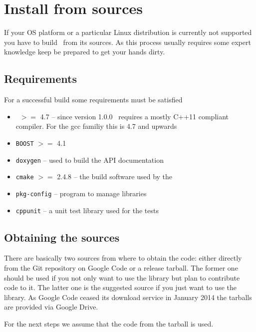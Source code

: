 \section{Install from sources}

If your OS platform or a particular Linux distribution is currently not
supported you have to build \libpnicore\ from its sources. As this process
usually requires some expert knowledge keep be prepared to get your hands dirty.

\subsection{Requirements}

For a successful build some requirements must be satisfied
\begin{itemize}
\item \gcc\ $>=$ 4.7 -- since version 1.0.0 \libpnicore\ requires a mostly C++11
compliant compiler. For the gcc familiy this is 4.7 and upwards
\item \texttt{BOOST} \cite{web:boostsite} $>=$ 4.1
\item \texttt{doxygen} \cite{web:doxygen} -- used to build the API documentation
\item \texttt{cmake} \cite{web:cmake} $>=$ 2.4.8 -- the build software used by the \libpnicore
\item \texttt{pkg-config} \cite{web:pkgconfig} -- program to manage libraries
\item \texttt{cppunit} \cite{web:cppunit} -- a unit test library used for the tests
\end{itemize}

\subsection{Obtaining the sources}

There are basically two sources from where to obtain the code: either directly
from the Git repository on Google Code or a release tarball. The former one
should be used if you not only want to use the library but plan to contribute
code to it. The latter one is the suggested source if you just want to use the
library.
As Google Code ceased its download service in January 2014 the tarballs are
provided via Google Drive.

For the next steps we assume that the code from the tarball is used.

